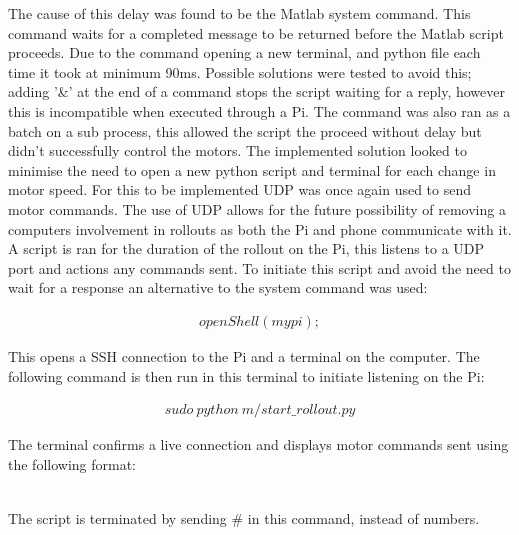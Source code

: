 \documentclass[twoside,twocolumn,12pt]{article}
\begin{document}
\newline
The cause of this delay was found to be the Matlab system command. This command waits for a completed message to be returned before the Matlab script proceeds. Due to the command opening a new terminal, and python file each time it took at minimum 90ms. Possible solutions were tested to avoid this; adding '\&' at the end of a command stops the script waiting for a reply, however this is incompatible when executed through a Pi. The command was also ran as a batch on a sub process, this allowed the script the proceed without delay but didn't successfully control the motors. 
\newline
The implemented solution looked to minimise the need to open a new python script and terminal for each change in motor speed. For this to be implemented UDP was once again used to send motor commands. The use of UDP allows for the future possibility of removing a computers involvement in rollouts as both the Pi and phone communicate with it. A script is ran for the duration of the rollout on the Pi, this listens to a UDP port and actions any commands sent. To initiate this script and avoid the need to wait for a response an alternative to the system command was used:

\begin{gather}
openShell(mypi); \nonumber
\end{gather}

This opens a SSH connection to the Pi and a terminal on the computer. The following command is then run in this terminal to initiate listening on the Pi:

\begin{gather}
sudo \: python \: m/start\_rollout.py  \nonumber
\end{gather}

The terminal confirms a live connection and displays motor commands sent using the following format:

\begin{gather}
[Flywheel \: Speed, \: Wheel \: Speed] \nonumber
\end{gather}

The script is terminated by sending \# in this command, instead of numbers.
\end{document}
